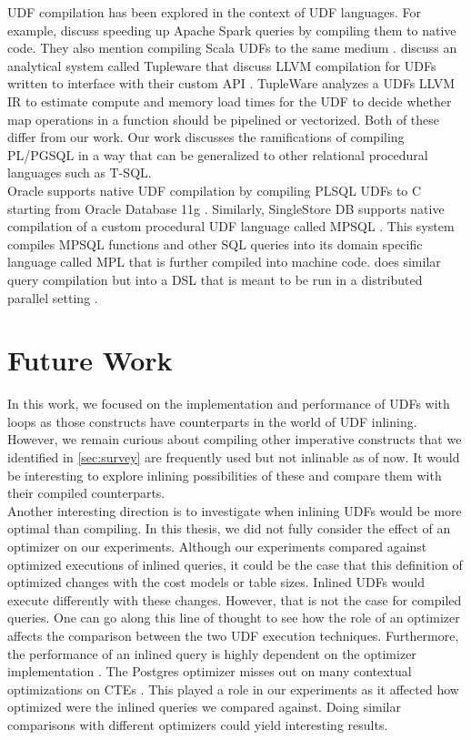 \documentclass[12pt]{cmuthesis}
\begin{document}
            UDF compilation has been explored in the context of UDF languages. For example, \citeauthor{Essertel18} discuss speeding up Apache Spark queries by compiling them to native code. They also mention compiling Scala UDFs to the same medium \cite{Essertel18}. \citeauthor{Crotty14} discuss an analytical system called Tupleware that discuss LLVM compilation for UDFs written to interface with their custom API \cite{Crotty14}. TupleWare analyzes a UDFs LLVM IR to estimate compute and memory load times for the UDF to decide whether map operations in a function should be pipelined or vectorized. Both of these differ from our work. Our work discusses the ramifications of compiling PL/PGSQL in a way that can be generalized to other relational procedural languages such as T-SQL.\\
            
            Oracle supports native UDF compilation by compiling PLSQL UDFs to C starting from Oracle Database 11g \cite{oracle11g}. Similarly, SingleStore DB supports native compilation of a custom procedural UDF language called MPSQL \cite{singlestore}. This system compiles MPSQL functions and other SQL queries into its domain specific language called MPL that is further compiled into machine code. \citeauthor{myers2014radish} does similar query compilation but into a DSL that is meant to be run in a distributed parallel setting \cite{myers2014radish}.


            \chapter{Future Work}
\label{sec:futurework}
In this work, we focused on the implementation and performance of UDFs with loops as those constructs have counterparts in the world of UDF inlining. However, we remain curious about compiling other imperative constructs that we identified in \cref{sec:survey} are frequently used but not inlinable as of now. It would be interesting to explore inlining possibilities of these and compare them with their compiled counterparts.\\

Another interesting direction is to investigate when inlining UDFs would be more optimal than compiling. In this thesis, we did not fully consider the effect of an optimizer on our experiments. Although our experiments compared against optimized executions of inlined queries, it could be the case that this definition of optimized changes with the cost models or table sizes. Inlined UDFs would execute differently with these changes. However, that is not the case for compiled queries. One can go along this line of thought to see how the role of an optimizer affects the comparison between the two UDF execution techniques. Furthermore, the performance of an inlined query is highly dependent on the optimizer implementation \cite{ramachandra19}. The Postgres optimizer misses out on many contextual optimizations on CTEs \cite{elhelw15}. This played a role in our experiments as it affected how optimized were the inlined queries we compared against. Doing similar comparisons with different optimizers could yield interesting results.\\
\end{document}
